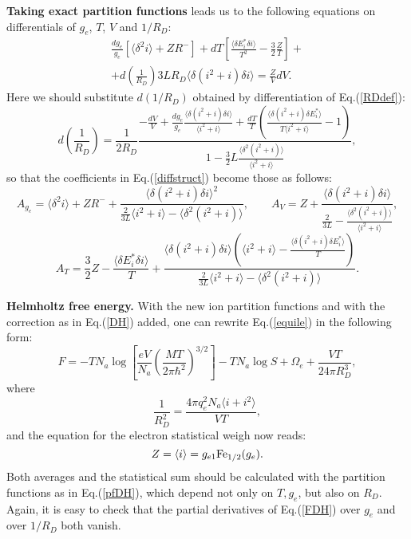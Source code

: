 {\bf Taking exact partition functions} leads us to the following equations on differentials of $g_e$, $T$, $V$ and $1/R_D$:
\begin{eqnarray}
\frac{dg_e}{g_e} \left[ \langle \delta^2 i \rangle + ZR^- \right] +
dT \left[ \frac{\langle \delta E^*_i \delta i \rangle}{T^2} - \frac32 \frac{Z}T \right] + \\
\nonumber + d\left( \frac{1}{R_D} \right) 3L R_D \langle \delta(i^2+i) \delta i \rangle = \frac{Z}V dV.
\end{eqnarray}
Here we should substitute $d(1/R_D)$ obtained by differentiation of Eq.(\ref{RDdef}):
\begin{equation}
d \left( \frac1{R_D} \right) = \frac{1}{2 R_D} \frac{-\frac{dV}{V} +
\frac{dg_e}{g_e} \frac{\langle \delta(i^2+i) \delta i \rangle}{\langle i^2+i \rangle} +
\frac{dT}{T} \left( \frac{\langle \delta(i^2+i) \delta E^*_i \rangle}{T \langle i^2+i \rangle} - 1 \right) }
{1 - \frac32L \frac{\langle \delta^2 (i^2+i) \rangle}{\langle i^2+i \rangle}},
\end{equation}
so that the coefficients in Eq.(\ref{diffstruct}) become those as follows:
\begin{equation}
A_{g_e} = \langle \delta^2 i \rangle + ZR^- + \frac{\langle \delta(i^2+i) \delta i \rangle^2}
{\frac{2}{3L} \langle i^2+i \rangle - \langle \delta^2 (i^2+i) \rangle}, \qquad
A_V = Z + \frac{\langle \delta(i^2+i) \delta i \rangle}
{\frac{2}{3L} - \frac{\langle \delta^2(i^2+i) \rangle}{\langle i^2+i \rangle}},
\end{equation}
\begin{equation}\nonumber
A_T = \frac32 Z - \frac{\langle \delta E^*_i \delta i \rangle}{T} +
\frac
{\langle \delta(i^2+i) \delta i \rangle \left( \langle i^2+i \rangle - \frac{\langle \delta(i^2+i) \delta E^*_i \rangle}{T} \right) }
{\frac{2}{3L} \langle i^2+i \rangle - \langle \delta^2(i^2+i) \rangle}.
\end{equation}

{\bf Helmholtz free energy.}
With the new ion partition functions and with the correction as in Eq.(\ref{DH}) added,
one can rewrite Eq.(\ref{equile}) in the following form:
\begin{equation}\label{FDH}
F = -TN_a\log\left[\frac{eV}{N_a}\left(\frac{MT}{2\pi \hbar^2}\right)^{3/2}\right]-TN_a\log S +\Omega_e +\frac{VT}{24\pi R_D^3}, 
\end{equation}
where
\begin{equation}\label{RDdef}
\frac1{R_D^2} = \frac{4\pi q_e^2N_a\langle i+i^2\rangle}{VT},
\end{equation}
and the equation for the electron statistical weigh now reads:
\begin{equation}
Z=\langle i\rangle=g_{e1}{\rm Fe}_{1/2}(g_e).
\end{equation}
Both averages and the statistical sum
should be calculated with the partition functions as in
Eq.(\ref{pfDH}), which depend not only on $T,g_e$, but also on $R_D$.
Again, it is easy to check that the partial derivatives of
Eq.(\ref{FDH}) over $g_e$ and over $1/R_D$ both vanish.

